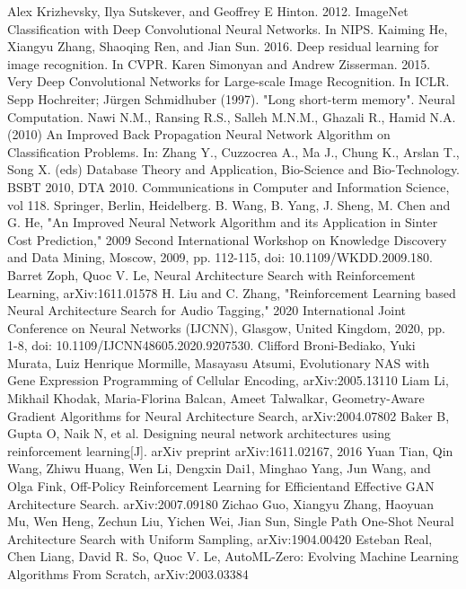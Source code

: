 \documentclass[conference]{IEEEtran}
\begin{document}
% 
\begin{thebibliography}{00}
 Alex Krizhevsky, Ilya Sutskever, and Geoffrey E Hinton. 2012. ImageNet Classification with Deep Convolutional Neural Networks. In NIPS. 
Kaiming He, Xiangyu Zhang, Shaoqing Ren, and Jian Sun. 2016. Deep residual learning for image recognition. In CVPR.
 Karen Simonyan and Andrew Zisserman. 2015. Very Deep Convolutional Networks for Large-scale Image Recognition. In ICLR.
 Sepp Hochreiter; Jürgen Schmidhuber (1997). "Long short-term memory". Neural Computation. 
 Nawi N.M., Ransing R.S., Salleh M.N.M., Ghazali R., Hamid N.A. (2010) An Improved Back Propagation Neural Network Algorithm on Classification Problems. In: Zhang Y., Cuzzocrea A., Ma J., Chung K., Arslan T., Song X. (eds) Database Theory and Application, Bio-Science and Bio-Technology. BSBT 2010, DTA 2010. Communications in Computer and Information Science, vol 118. Springer, Berlin, Heidelberg.
 B. Wang, B. Yang, J. Sheng, M. Chen and G. He, "An Improved Neural Network Algorithm and its Application in Sinter Cost Prediction," 2009 Second International Workshop on Knowledge Discovery and Data Mining, Moscow, 2009, pp. 112-115, doi: 10.1109/WKDD.2009.180.
 Barret Zoph, Quoc V. Le, Neural Architecture Search with Reinforcement Learning, arXiv:1611.01578
 H. Liu and C. Zhang, "Reinforcement Learning based Neural Architecture Search for Audio Tagging," 2020 International Joint Conference on Neural Networks (IJCNN), Glasgow, United Kingdom, 2020, pp. 1-8, doi: 10.1109/IJCNN48605.2020.9207530.
 Clifford Broni-Bediako, Yuki Murata, Luiz Henrique Mormille, Masayasu Atsumi, Evolutionary NAS with Gene Expression Programming of Cellular Encoding, arXiv:2005.13110
 Liam Li, Mikhail Khodak, Maria-Florina Balcan, Ameet Talwalkar, Geometry-Aware Gradient Algorithms for Neural Architecture Search, arXiv:2004.07802
 Baker B, Gupta O, Naik N, et al. Designing neural network architectures using reinforcement learning[J]. arXiv preprint arXiv:1611.02167, 2016
 Yuan Tian, Qin Wang, Zhiwu Huang, Wen Li, Dengxin Dai1, Minghao Yang, Jun Wang, and Olga Fink, Off-Policy Reinforcement Learning for Efficientand Effective GAN Architecture Search. arXiv:2007.09180
 Zichao Guo, Xiangyu Zhang, Haoyuan Mu, Wen Heng, Zechun Liu, Yichen Wei, Jian Sun, Single Path One-Shot Neural Architecture Search with Uniform Sampling, arXiv:1904.00420
 Esteban Real, Chen Liang, David R. So, Quoc V. Le, AutoML-Zero: Evolving Machine Learning Algorithms From Scratch, arXiv:2003.03384

\end{thebibliography}
\end{document}
